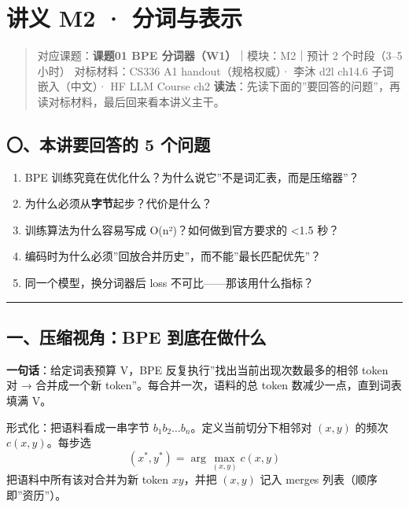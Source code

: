 \documentclass[
  chinese,
  11pt,
]{ctexart}
\providecommand{\tightlist}{%
  \setlength{\itemsep}{0pt}\setlength{\parskip}{0pt}}
\begin{document}
\section{讲义 M2 · 分词与表示}\label{ux8bb2ux4e49-m2-ux5206ux8bcdux4e0eux8868ux793a}

\begin{quote}
对应课题：\textbf{课题01 BPE 分词器（W1）}｜模块：M2｜预计 2 个时段（3--5 小时） 对标材料：CS336 A1 handout（规格权威）· 李沐 d2l ch14.6 子词嵌入（中文）· HF LLM Course ch2 \textbf{读法}：先读下面的''要回答的问题''，再读对标材料，最后回来看本讲义主干。
\end{quote}

\subsection{〇、本讲要回答的 5 个问题}\label{ux672cux8bb2ux8981ux56deux7b54ux7684-5-ux4e2aux95eeux9898-2}

\begin{enumerate}
\def\labelenumi{\arabic{enumi}.}
\tightlist
\item
  BPE 训练究竟在优化什么？为什么说它''不是词汇表，而是压缩器''？
\item
  为什么必须从\textbf{字节}起步？代价是什么？
\item
  训练算法为什么容易写成 O(n²)？如何做到官方要求的 \textless1.5 秒？
\item
  编码时为什么必须''回放合并历史''，而不能''最长匹配优先''？
\item
  同一个模型，换分词器后 loss 不可比------那该用什么指标？
\end{enumerate}

\begin{center}\rule{0.5\linewidth}{0.5pt}\end{center}

\subsection{一、压缩视角：BPE 到底在做什么}\label{ux4e00ux538bux7f29ux89c6ux89d2bpe-ux5230ux5e95ux5728ux505aux4ec0ux4e48}

\textbf{一句话}：给定词表预算 V，BPE 反复执行''找出当前出现次数最多的相邻 token 对 → 合并成一个新 token''。每合并一次，语料的总 token 数减少一点，直到词表填满 V。

形式化：把语料看成一串字节 \(b_1 b_2 \dots b_n\)。定义当前切分下相邻对 \((x,y)\) 的频次 \(c(x,y)\)。每步选 \[(x^*, y^*) = \arg\max_{(x,y)} c(x,y)\] 把语料中所有该对合并为新 token \(xy\)，并把 \((x,y)\) 记入 merges 列表（顺序即''资历''）。
\end{document}
